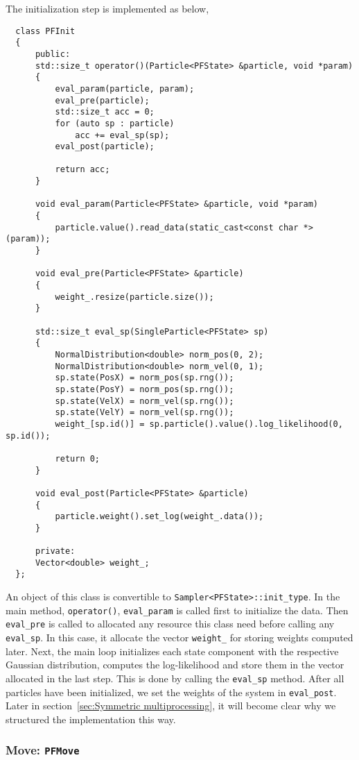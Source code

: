 The initialization step is implemented as below,
\begin{Verbatim}
  class PFInit
  {
      public:
      std::size_t operator()(Particle<PFState> &particle, void *param)
      {
          eval_param(particle, param);
          eval_pre(particle);
          std::size_t acc = 0;
          for (auto sp : particle)
              acc += eval_sp(sp);
          eval_post(particle);

          return acc;
      }

      void eval_param(Particle<PFState> &particle, void *param)
      {
          particle.value().read_data(static_cast<const char *>(param));
      }

      void eval_pre(Particle<PFState> &particle)
      {
          weight_.resize(particle.size());
      }

      std::size_t eval_sp(SingleParticle<PFState> sp)
      {
          NormalDistribution<double> norm_pos(0, 2);
          NormalDistribution<double> norm_vel(0, 1);
          sp.state(PosX) = norm_pos(sp.rng());
          sp.state(PosY) = norm_pos(sp.rng());
          sp.state(VelX) = norm_vel(sp.rng());
          sp.state(VelY) = norm_vel(sp.rng());
          weight_[sp.id()] = sp.particle().value().log_likelihood(0, sp.id());

          return 0;
      }

      void eval_post(Particle<PFState> &particle)
      {
          particle.weight().set_log(weight_.data());
      }

      private:
      Vector<double> weight_;
  };
\end{Verbatim}
An object of this class is convertible to \verb|Sampler<PFState>::init_type|.
In the main method, \verb|operator()|, \verb|eval_param| is called first to
initialize the data. Then \verb|eval_pre| is called to allocated any resource
this class need before calling any \verb|eval_sp|. In this case, it allocate
the vector \verb|weight_| for storing weights computed later. Next, the main
loop initializes each state component with the respective Gaussian
distribution, computes the log-likelihood and store them in the vector
allocated in the last step. This is done by calling the \verb|eval_sp| method.
After all particles have been initialized, we set the weights of the system in
\verb|eval_post|. Later in section~\ref{sec:Symmetric multiprocessing}, it will
become clear why we structured the implementation this way.

\subsubsection{Move: \texttt{PFMove}}

